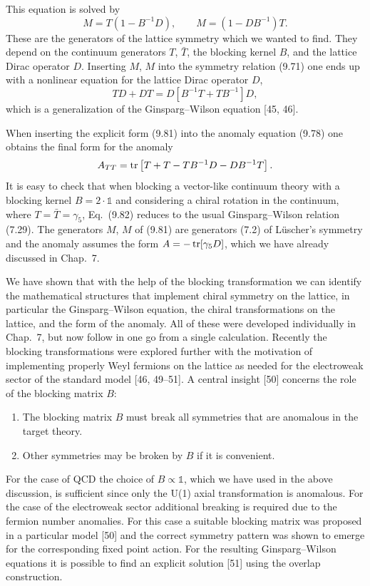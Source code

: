 This equation is solved by
\begin{equation}
  M = T\left(1 - B^{-1}D\right) , \qquad
  M = \left(1 - DB^{-1}\right)T .
\end{equation}
These are the generators of the lattice symmetry which we wanted to find. They
depend on the continuum generators $T$, $\bar T$, the blocking kernel $B$, and
the lattice Dirac operator $D$. Inserting $M$, $M$ into the symmetry relation
(9.71) one ends up with a nonlinear equation for the lattice Dirac operator
$D$,
\begin{equation}
  T D + D T = D\left[B^{-1}T + T B^{-1}\right]D ,
\end{equation}
which is a generalization of the Ginsparg--Wilson equation [45, 46].

When inserting the explicit form (9.81) into the anomaly equation (9.78) one
obtains the final form for the anomaly
\begin{equation}
  A_{TT} = \operatorname{tr}\left[T + T - T B^{-1}D - D B^{-1}T\right] .
\end{equation}
It is easy to check that when blocking a vector-like continuum theory with a
blocking kernel $B = 2\cdot\mathbb{1}$ and considering a chiral rotation in
the continuum, where $T = \bar T = \gamma_5$, Eq.~(9.82) reduces to the usual
Ginsparg--Wilson relation (7.29). The generators $M$, $M$ of (9.81) are
generators (7.2) of L\"uscher's symmetry and the anomaly assumes the form $A =
-\operatorname{tr}[\gamma_5 D]$, which we have already discussed in Chap.~7.

We have shown that with the help of the blocking transformation we can identify
the mathematical structures that implement chiral symmetry on the lattice, in
particular the Ginsparg--Wilson equation, the chiral transformations on the
lattice, and the form of the anomaly. All of these were developed individually
in Chap.~7, but now follow in one go from a single calculation. Recently the
blocking transformations were explored further with the motivation of
implementing properly Weyl fermions on the lattice as needed for the
electroweak sector of the standard model [46, 49--51]. A central insight [50]
concerns the role of the blocking matrix $B$:
\begin{enumerate}
  \item The blocking matrix $B$ must break all symmetries that are anomalous
        in the target theory.
  \item Other symmetries may be broken by $B$ if it is convenient.
\end{enumerate}
For the case of QCD the choice of $B \propto \mathbb{1}$, which we have used in
the above discussion, is sufficient since only the U(1) axial transformation
is anomalous. For the case of the electroweak sector additional breaking is
required due to the fermion number anomalies. For this case a suitable
blocking matrix was proposed in a particular model [50] and the correct
symmetry pattern was shown to emerge for the corresponding fixed point action.
For the resulting Ginsparg--Wilson equations it is possible to find an explicit
solution [51] using the overlap construction.

